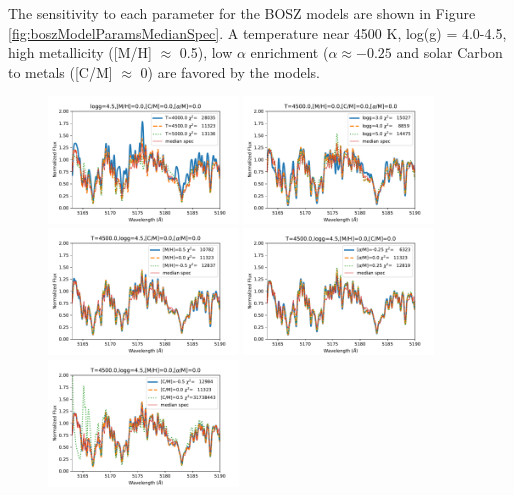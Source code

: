 \documentclass[preprint]{aastex61}
\begin{document}
The sensitivity to each parameter for the BOSZ models are shown in Figure \ref{fig:boszModelParamsMedianSpec}.
A temperature near 4500 K, log(g) = 4.0-4.5, high metallicity ([M/H] $\approx$ 0.5), low $\alpha$ enrichment ($\alpha \approx -0.25$ and solar Carbon to metals ([C/M] $\approx$ 0) are favored by the models.

\begin{figure}[!hbtp]
\begin{centering}
\includegraphics[width=0.45\textwidth]{images/bosz_model_exploration/T_EFF_exploration.pdf}
\includegraphics[width=0.45\textwidth]{images/bosz_model_exploration/LOGG_exploration}
\includegraphics[width=0.45\textwidth]{images/bosz_model_exploration/MH_exploration.pdf}
\includegraphics[width=0.45\textwidth]{images/bosz_model_exploration/ALPHA_exploration.pdf}
\includegraphics[width=0.45\textwidth]{images/bosz_model_exploration/CM_exploration.pdf}

\end{centering}
\end{figure}
\end{document}
